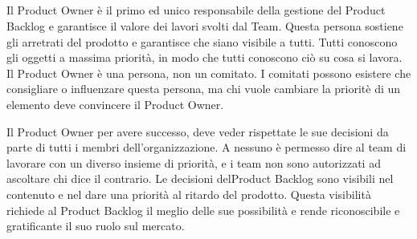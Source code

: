\subsection*{\color{Blue}{IL PRODUCT OWNER}}
\label{sec:productowner}
Il Product Owner \`e il primo ed unico responsabile della gestione del \foreignlanguage{english}{Pro\-duct Backlog} e garantisce il valore dei lavori svolti dal Team. Questa persona sostiene gli arretrati del prodotto e garantisce che siano visibile a tutti. Tutti conoscono gli oggetti a massima priorit\`a, in modo che tutti conoscono ci\`o su cosa si lavora.\\
Il Product Owner \`e  una persona, non un comitato. I comitati possono esistere che consigliare o influenzare questa persona, ma chi vuole cambiare la priorit\`e di un elemento deve convincere il Product Owner.

\vspace{0.4cm}


\vspace{0.4cm}
\vspace{0.4cm}
\linebreak
Il Product Owner per avere successo, deve veder rispettate le sue decisioni da parte di tutti i membri dell'organizzazione. A nessuno \`e  permesso dire al team di lavorare con un diverso insieme di priorit\`a, e i team non sono autorizzati ad ascoltare chi dice il contrario. Le decisioni del\foreignlanguage{english}{Product Backlog} sono visibili nel contenuto e nel dare una priorit\`a al ritardo del prodotto. Questa visibilit\`a richiede al \foreignlanguage{english}{Product Backlog} il meglio delle sue possibilit\`a e rende riconoscibile e gratificante il suo ruolo sul mercato.\\


